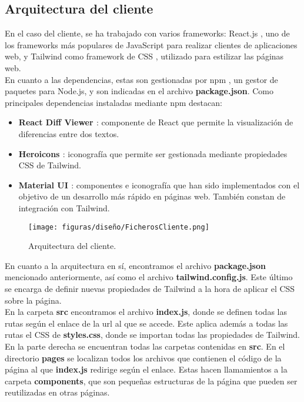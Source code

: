 \subsection{Arquitectura del cliente}

En el caso del cliente, se ha trabajado con varios frameworks: React.js \cite{react}, uno de los frameworks más populares de JavaScript para realizar clientes de aplicaciones web, y Tailwind \cite{tailwind} como framework de CSS \cite{css}, utilizado para estilizar las páginas web.
\\

En cuanto a las dependencias, estas son gestionadas por npm \cite{npm}, un gestor de paquetes para Node.js, y son indicadas en el archivo {\bf package.json}. Como principales dependencias instaladas mediante npm destacan:
\begin{itemize}
    \item {\bf React Diff Viewer \cite{reactdiffviewer}}: componente de React que permite la visualización de diferencias entre dos textos.
    \item {\bf Heroicons \cite{heroicons}}: iconografía que permite ser gestionada mediante propiedades CSS de Tailwind.
    \item {\bf Material UI \cite{materialui}}: componentes e iconografía que han sido implementados con el objetivo de un desarrollo más rápido en páginas web. También constan de integración con Tailwind.
\end{itemize}

\begin{figure}[H]
\centerline{\texttt{[image: figuras/diseño/FicherosCliente.png]}}
\caption{Arquitectura del cliente.}
\label{enlaceArquitecturaCliente}
\end{figure}

En cuanto a la arquitectura en sí, encontramos el archivo {\bf package.json} mencionado anteriormente, así como el archivo {\bf tailwind.config.js}. Este último se encarga de definir nuevas propiedades de Tailwind a la hora de aplicar el CSS sobre la página.
\\

En la carpeta {\bf src} encontramos el archivo {\bf index.js}, donde se definen todas las rutas según el enlace de la url al que se accede. Este aplica además a todas las rutas el CSS de {\bf styles.css}, donde se importan todas las propiedades de Tailwind.
\\

En la parte derecha se encuentran todas las carpetas contenidas en {\bf src}. En el directorio {\bf pages} se localizan todos los archivos que contienen el código de la página al que {\bf index.js} redirige según el enlace. Estas hacen llamamientos a la carpeta {\bf components}, que son pequeñas estructuras de la página que pueden ser reutilizadas en otras páginas.
\\


